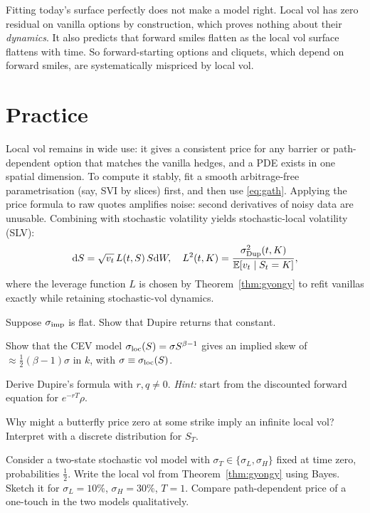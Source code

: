 \begin{pitfall}
Fitting today's surface perfectly does not make a model right. Local vol has zero residual on vanilla options by construction, which proves nothing about their \emph{dynamics}. It also predicts that forward smiles flatten as the local vol surface flattens with time. So forward-starting options and cliquets, which depend on forward smiles, are systematically mispriced by local vol.
\end{pitfall}

\section{Practice}

Local vol remains in wide use: it gives a consistent price for any barrier or path-dependent option that matches the vanilla hedges, and a PDE exists in one spatial dimension. To compute it stably, fit a smooth arbitrage-free parametrisation (say, SVI by slices) first, and then use \eqref{eq:gath}. Applying the price formula to raw quotes amplifies noise: second derivatives of noisy data are unusable. Combining with stochastic volatility yields stochastic-local volatility (SLV):
\[
\mathrm{d} S=\sqrt{v_t}\,L(t,S)\,S\mathrm{d} W,\quad L^2(t,K)=\frac{\sigma_{\rm Dup}^2(t,K)}{\mathbb{E}[v_t\mid S_t=K]},
\]
where the leverage function $L$ is chosen by Theorem~\ref{thm:gyongy} to refit vanillas exactly while retaining stochastic-vol dynamics.

\begin{exercises}
\item Suppose $\sigma_{\rm imp}$ is flat. Show that Dupire returns that constant.
\item Show that the CEV model $\sigma_{\rm loc}(S)=\sigma S^{\beta-1}$ gives an implied skew of $\approx\frac12(\beta-1)\sigma$ in $k$, with $\sigma\equiv\sigma_{\rm loc}(S)$.
\item Derive Dupire's formula with $r,q\ne0$. \emph{Hint:} start from the discounted forward equation for $e^{-rT}\rho$.
\item Why might a butterfly price zero at some strike imply an infinite local vol? Interpret with a discrete distribution for $S_T$.
\item Consider a two-state stochastic vol model with $\sigma_T\in\{\sigma_L,\sigma_H\}$ fixed at time zero, probabilities $\tfrac12$. Write the local vol from Theorem~\ref{thm:gyongy} using Bayes. Sketch it for $\sigma_L=10\%$, $\sigma_H=30\%$, $T=1$. Compare path-dependent price of a one-touch in the two models qualitatively.
\end{exercises}
